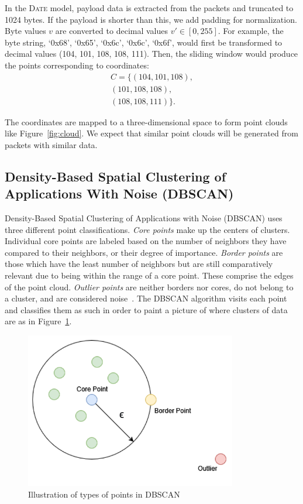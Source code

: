 In the \textsc{Date} model, payload data is extracted from the packets and truncated to 1024 bytes. If the payload is shorter than this, we add padding for normalization. Byte values $v$ are converted to decimal values $v' \in [0,255]$. For example, the byte string, `0x68', `0x65', `0x6c', `0x6c', `0x6f', would first be transformed to decimal values (104, 101, 108, 108, 111). Then, the sliding window would produce the points corresponding to coordinates:
\begin{equation}
\begin{split}
     C =
\{(104, 101, 108), \\ (101, 108, 108), \\ (108, 108, 111)\}.
\end{split}
\end{equation}

The coordinates are mapped to a three-dimensional space to form point clouds like Figure~\ref{fig:cloud}. We expect that similar point clouds will be generated from packets with similar data.


\subsection{Density-Based Spatial Clustering of Applications With Noise (DBSCAN)}

Density-Based Spatial Clustering of Applications with Noise (DBSCAN) uses three different point classifications. \textit{Core points} make up the centers of clusters. Individual core points are labeled based on the number of neighbors they have compared to their neighbors, or their degree of importance. \textit{Border points} are those which have the least number of neighbors but are still comparatively relevant due to being within the range of a core point. These comprise the edges of the point cloud. \textit{Outlier points} are neither borders nor cores, do not belong to a cluster, and are considered noise~\cite{schubert2017dbscan}. The DBSCAN algorithm visits each point and classifies them as such in order to paint a picture of where clusters of data are as in Figure~\ref{fig:dbscan}.

\begin{figure} [ht!]
\centering
\includegraphics[scale=0.4]{chapters/6/img/dbscan.drawio.png}
\caption{Illustration of types of points in DBSCAN}
\label{fig:dbscan}
\end{figure}

